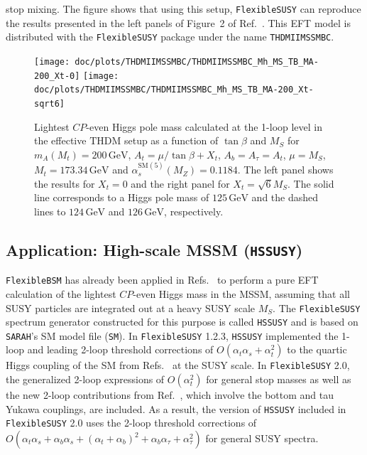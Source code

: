 \documentclass[final,3p,11pt,pdflatex]{elsarticle}
\makeatletter
\newcommand{\modelname}[1]{\texttt{#1}\@\xspace}
\newcommand{\sarah}{\texttt{SARAH}\@\xspace}
\newcommand{\fs}{\texttt{FlexibleSUSY}\@\xspace}
\newcommand{\HSSUSY}{\modelname{HSSUSY}}
\newcommand{\fstwo}{\fs 2.0\@\xspace}
\newcommand{\fbsm}{\texttt{FlexibleBSM}\@\xspace}
\newcommand{\unit}[1]{\,\text{#1}}      %
\newcommand{\SM}{\ensuremath{\text{SM}}\xspace}
\newcommand{\THDM}{\ensuremath{\text{THDM}}\xspace}
\newcommand{\MS}{\ensuremath{M_S}\xspace}
\newcommand{\CP}{\ensuremath{CP}\xspace}
\def\at{\alpha_t}
\def\ab{\alpha_b}
\def\as{\alpha_s}
\def\atau{\alpha_{\tau}}
\makeatother
\begin{document}
stop mixing.  The figure shows that using this setup, \fs can reproduce
the results presented in the left panels of Figure~2 of
Ref.~\cite{Lee:2015uza}.  This EFT model is
distributed with the \fs package under the name \modelname{THDMIIMSSMBC}.
%
\begin{figure}[tbh]
  \centering
  \texttt{[image: doc/plots/THDMIIMSSMBC/THDMIIMSSMBC\_Mh\_MS\_TB\_MA-200\_Xt-0]}\hfill
  \texttt{[image: doc/plots/THDMIIMSSMBC/THDMIIMSSMBC\_Mh\_MS\_TB\_MA-200\_Xt-sqrt6]}
  \caption{Lightest \CP-even Higgs pole mass calculated at the 1-loop
    level in the effective \THDM setup as a function of $\tan\beta$ and
    $\MS$ for $m_A(M_t) = 200\unit{GeV}$, $A_t = \mu/\tan\beta +
    X_t$, $A_b = A_\tau = A_t$, $\mu = \MS$, $M_t = 173.34\unit{GeV}$
    and $\as^{\SM(5)}(M_Z) = 0.1184$.  The left panel shows the results for $X_t
    = 0$ and the right panel for $X_t = \sqrt{6}\MS$.  The solid line
    corresponds to a Higgs pole mass of $125\unit{GeV}$ and the dashed
    lines to $124\unit{GeV}$ and $126\unit{GeV}$, respectively.}
  \label{fig:THDMIIMSSMBC_Mh_MS}
\end{figure}

\subsection{Application: High-scale MSSM (\HSSUSY)}
\label{sec:application_HSSUSY}

\fbsm has already been applied in
Refs.~\cite{Bagnaschi:2015pwa,Athron:2016fuq,Bagnaschi:2017xid} to perform a
pure EFT calculation of the lightest \CP-even Higgs mass in the MSSM,
assuming that all SUSY particles are integrated out at a heavy SUSY
scale $\MS$.  The \fs spectrum generator constructed for this purpose
is called \HSSUSY and is based on \sarah's SM model file
(\modelname{SM}).  In \fs 1.2.3, \HSSUSY implemented the 1-loop and leading
2-loop threshold corrections of $O(\at\as + \at^2)$ to the quartic Higgs
coupling of the SM from
Refs.~\cite{Bagnaschi:2014rsa,Vega:2015fna} at the SUSY scale.  In
\fstwo, the generalized 2-loop expressions of $O(\at^2)$ for general stop
masses as well as the new 2-loop contributions from Ref.~\cite{Bagnaschi:2017xid},
which involve the bottom and tau Yukawa couplings, are
included.  As a result, the version of \HSSUSY included in \fstwo uses
the 2-loop threshold corrections of
$O(\at\as + \ab\as + (\at+\ab)^2 + \ab\atau + \atau^2)$ for general
SUSY spectra.
\end{document}
